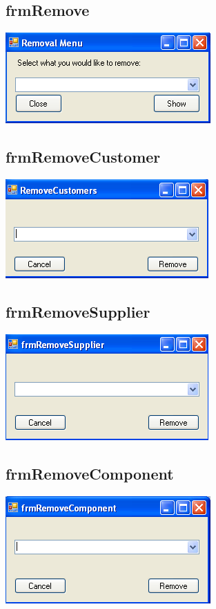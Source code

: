 \subsection{frmRemove}
	\includegraphics[scale=0.5]{frmRemove_scrot}
	
	
\subsection{frmRemoveCustomer}
	\includegraphics[scale=0.5]{frmRemoveCustomer_scrot}
	
	
\subsection{frmRemoveSupplier}
	\includegraphics[scale=0.5]{frmRemoveSupplier_scrot}
	
	
\subsection{frmRemoveComponent}
	\includegraphics[scale=0.5]{frmRemoveComponent_scrot}
	

